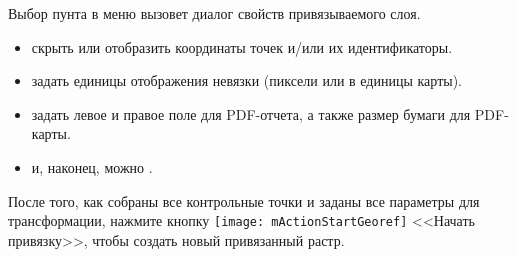 
Выбор пунта  в меню  вызовет
диалог свойств привязываемого слоя.


\begin{itemize}[label=--]
\item скрыть или отобразить координаты точек и/или их идентификаторы.
\item задать единицы отображения невязки (пиксели или в единицы карты).
\item задать левое и правое поле для PDF-отчета, а также размер бумаги для
PDF-карты.
\item и, наконец, можно .
\end{itemize}

\label{georeferencer_running}

После того, как собраны все контрольные точки и заданы все параметры для
трансформации, нажмите кнопку \texttt{[image: mActionStartGeoref]}
<<Начать привязку>>, чтобы создать новый привязанный растр.


